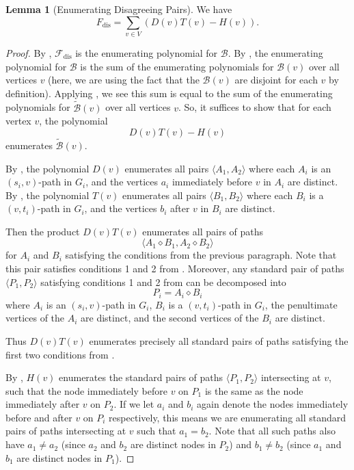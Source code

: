 \documentclass[11pt]{article}
\newcommand{\grp}[1]{\left(#1\right)}
\newcommand{\dia}{\diamond}
\newcommand{\ca}{\mathcal}
\newcommand{\Frev}{F_{\text{dis}}}
\newcommand{\Fdis}{\mathcal{F}_{\text{dis}}}
\theoremstyle{definition}
\newtheorem{lemma}[theorem]{Lemma}
\begin{document}
\begin{lemma}[Enumerating Disagreeing Pairs]
\label{enum:disgreeing-paths}
    We have 
    \[\Frev = \sum_{v\in V} \grp{D(v)T(v) - H(v) }.\]
\end{lemma}
\begin{proof}
    By , $\Fdis$ is the enumerating polynomial for $\ca{B}$.
    By , the enumerating polynomial for $\ca{B}$ is the sum of the enumerating polynomials for $\ca{B}(v)$ over all vertices $v$
    (here, we are using the fact that the $\ca{B}(v)$ are disjoint for each $v$ by definition).
    Applying , we see this sum is equal to the sum of the enumerating polynomials for $\tilde{\ca{B}}(v)$ over all vertices $v$.
    So, it suffices to show that for each vertex $v$, the polynomial
        \begin{equation}
\label{remove:condition}
        D(v)T(v) - H(v)
        \end{equation}
    enumerates $\tilde{\mathcal{B}}(v)$.

    By , the polynomial $D(v)$ enumerates all pairs $\langle A_1,A_2\rangle$ where each $A_i$ is an $(s_i,v)$-path in $G_i$, and the vertices $a_i$ immediately before $v$ in $A_i$ are distinct.
    By , the polynomial $T(v)$ enumerates all pairs $\langle B_1,B_2\rangle$ where each $B_i$ is a $(v,t_i)$-path in $G_i$, and the  vertices $b_i$ after $v$ in $B_i$ are distinct.
    
    Then the product $D(v)T(v)$ enumerates all pairs of paths \[\langle A_1\dia B_1,A_2\dia B_2\rangle\] for $A_i$ and $B_i$ satisfying the conditions from the previous paragraph.
    Note that this pair satisfies conditions 1 and 2 from .
    Moreover, any standard pair of paths $\langle P_1,P_2\rangle$ satisfying conditions 1 and 2 from  can be decomposed into 
        \[P_i = A_i\dia B_i\]
    where $A_i$ is an $(s_i,v)$-path in $G_i$, $B_i$ is a $(v,t_i)$-path in $G_i$, the penultimate vertices of the $A_i$  are distinct, and the second vertices of the $B_i$ are distinct.

    Thus $D(v)T(v)$ enumerates precisely all standard pairs of paths satisfying the first two conditions from .

    By , $H(v)$ enumerates the standard pairs of paths $\langle P_1,P_2\rangle$ intersecting at $v$, such that the node immediately before $v$ on $P_1$ is the same as the node immediately after $v$ on $P_2$.
    If we let $a_i$ and $b_i$ again denote the nodes immediately before and after $v$ on $P_i$ respectively, this means we are enumerating all standard pairs of paths intersecting at $v$ such that $a_1 = b_2$.
    Note that all such paths also have $a_1\neq a_2$ (since $a_2$ and $b_2$ are distinct nodes in $P_2$) and $b_1\neq b_2$ (since $a_1$ and $b_1$ are distinct nodes in $P_1$).


\end{proof}
\end{document}
